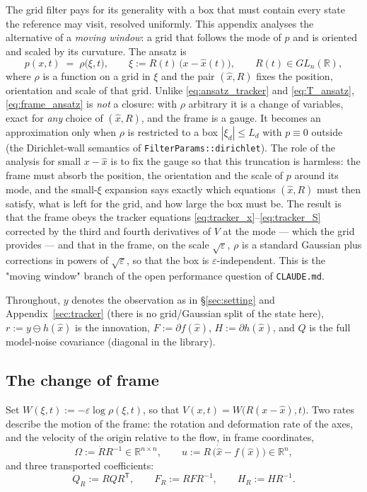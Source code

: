\documentclass[11pt,a4paper]{article}
\newcommand{\R}{\mathbb{R}}
\newcommand{\T}{^{\mathsf T}}
\newcommand{\xh}{\hat{x}}
\newcommand{\eps}{\varepsilon}
\newcommand{\abs}[1]{\left\lvert #1 \right\rvert}
\theoremstyle{plain}
\theoremstyle{definition}
\theoremstyle{remark}
\begin{document}
The grid filter pays for its generality with a box that must contain every state the reference may visit, resolved uniformly. This appendix analyses the alternative of a \emph{moving window}: a grid that follows the mode of $p$ and is oriented and scaled by its curvature. The ansatz is
\begin{equation}
  p(x,t) \;=\; \rho\big(\xi,t\big), \qquad \xi := R(t)\,\big(x-\xh(t)\big), \qquad R(t)\in GL_n(\R),
  \label{eq:frame_ansatz}
\end{equation}
where $\rho$ is a function on a grid in $\xi$ and the pair $(\xh,R)$ fixes the position, orientation and scale of that grid. Unlike \eqref{eq:ansatz_tracker} and \eqref{eq:T_ansatz}, \eqref{eq:frame_ansatz} is \emph{not} a closure: with $\rho$ arbitrary it is a change of variables, exact for \emph{any} choice of $(\xh,R)$, and the frame is a gauge. It becomes an approximation only when $\rho$ is restricted to a box $\abs{\xi_d}\le L_d$ with $p\equiv0$ outside (the Dirichlet-wall semantics of \texttt{FilterParams::dirichlet}). The role of the analysis for small $x-\xh$ is to fix the gauge so that this truncation is harmless: the frame must absorb the position, the orientation and the scale of $p$ around its mode, and the small-$\xi$ expansion says exactly which equations $(\xh,R)$ must then satisfy, what is left for the grid, and how large the box must be. The result is that the frame obeys the tracker equations \eqref{eq:tracker_x}--\eqref{eq:tracker_S} corrected by the third and fourth derivatives of $V$ at the mode --- which the grid provides --- and that in the frame, on the scale $\sqrt\eps$, $\rho$ is a standard Gaussian plus corrections in powers of $\sqrt\eps$, so that the box is $\eps$-independent. This is the "moving window" branch of the open performance question of \texttt{CLAUDE.md}.

Throughout, $y$ denotes the observation as in \S\ref{sec:setting} and Appendix~\ref{sec:tracker} (there is no grid/Gaussian split of the state here), $r := y\ominus h(\xh)$ is the innovation, $F:=\partial f(\xh)$, $H:=\partial h(\xh)$, and $Q$ is the full model-noise covariance (diagonal in the library).

\subsection{The change of frame}

Set $W(\xi,t) := -\eps\log\rho(\xi,t)$, so that $V(x,t) = W\big(R(x-\xh),t\big)$. Two rates describe the motion of the frame: the rotation and deformation rate of the axes, and the velocity of the origin relative to the flow, in frame coordinates,
\begin{equation}
  \Omega := \dot R R^{-1}\in\R^{n\times n}, \qquad
  u := R\,\big(\dot{\xh} - f(\xh)\big)\in\R^n ,
  \label{eq:frame_rates}
\end{equation}
and three transported coefficients:
\begin{equation}
  Q_R := RQR\T, \qquad F_R := RFR^{-1}, \qquad H_R := HR^{-1}.
  \label{eq:frame_coeffs}
\end{equation}
\end{document}
